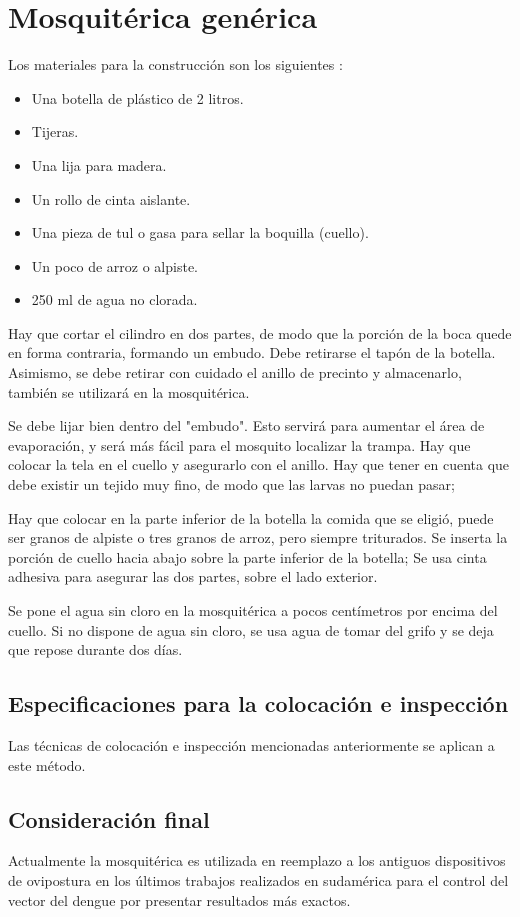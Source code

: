 \section{Mosquitérica genérica}

Los materiales para la construcción son los siguientes :
\begin{itemize}
    \item Una botella de plástico de 2 litros.
    \item Tijeras.
    \item Una lija para madera.
    \item Un rollo de cinta aislante.
    \item Una pieza de tul o gasa para sellar la boquilla (cuello).
    \item Un poco de arroz o alpiste.
    \item 250 ml de agua no clorada.
\end{itemize}

Hay que cortar el cilindro en dos partes, de modo que la porción de la
boca quede en forma contraria, formando un embudo. Debe retirarse el tapón
de la botella. Asimismo, se debe retirar con cuidado el anillo de precinto
y almacenarlo, también se utilizará en la mosquitérica.

Se debe lijar bien dentro del "embudo". Esto servirá para aumentar el área
de evaporación, y será más fácil para el mosquito localizar la  trampa.
Hay que colocar la  tela en el cuello y asegurarlo con el anillo. Hay que
tener en cuenta que debe existir un tejido muy fino, de modo que las larvas
no puedan pasar;


Hay que colocar en la parte inferior de la botella la comida que se eligió,
puede ser granos de alpiste o tres granos de arroz, pero siempre triturados.
Se inserta la porción de cuello hacia abajo sobre la parte inferior de la
botella; Se usa cinta adhesiva para asegurar las dos partes, sobre el lado
exterior.

Se pone el agua sin cloro en la mosquitérica a pocos centímetros por encima
del cuello. Si no dispone de agua sin cloro, se usa agua de tomar del grifo
y se deja que repose durante dos días.

\subsection{Especificaciones para la colocación e inspección}
Las técnicas de colocación e inspección mencionadas anteriormente se aplican
a este método.

\subsection{Consideración final}
Actualmente la mosquitérica es utilizada en reemplazo a los antiguos
dispositivos de ovipostura en los últimos trabajos realizados en sudamérica
para el control del vector del dengue por presentar resultados más exactos.
